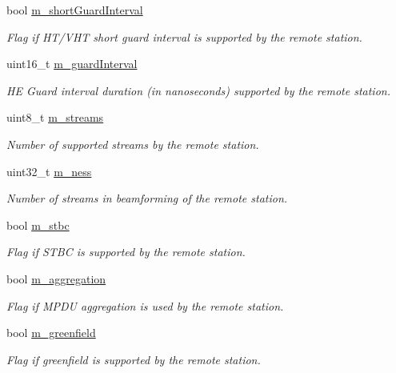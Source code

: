\begin{DoxyCompactItemize}
bool \hyperlink{structns3_1_1WifiRemoteStationState_af0c8e10d63d0b1b5737ae917b3e40b64}{m\+\_\+short\+Guard\+Interval}
\begin{DoxyCompactList}\small\item\em Flag if H\+T/\+V\+HT short guard interval is supported by the remote station. \end{DoxyCompactList}\item 
uint16\+\_\+t \hyperlink{structns3_1_1WifiRemoteStationState_a9e41a4074f9a7d5a61be765d53abcd6f}{m\+\_\+guard\+Interval}
\begin{DoxyCompactList}\small\item\em HE Guard interval duration (in nanoseconds) supported by the remote station. \end{DoxyCompactList}\item 
uint8\+\_\+t \hyperlink{structns3_1_1WifiRemoteStationState_ab79b977be200ef95202fb2428b2abd7b}{m\+\_\+streams}
\begin{DoxyCompactList}\small\item\em Number of supported streams by the remote station. \end{DoxyCompactList}\item 
uint32\+\_\+t \hyperlink{structns3_1_1WifiRemoteStationState_a6e8f943986e886b04278448baaa469c6}{m\+\_\+ness}
\begin{DoxyCompactList}\small\item\em Number of streams in beamforming of the remote station. \end{DoxyCompactList}\item 
bool \hyperlink{structns3_1_1WifiRemoteStationState_ab3569204fee0b74e9ea330c7ec2bf6e8}{m\+\_\+stbc}
\begin{DoxyCompactList}\small\item\em Flag if S\+T\+BC is supported by the remote station. \end{DoxyCompactList}\item 
bool \hyperlink{structns3_1_1WifiRemoteStationState_a83a20126c91366c8b8ba144122813ae0}{m\+\_\+aggregation}
\begin{DoxyCompactList}\small\item\em Flag if M\+P\+DU aggregation is used by the remote station. \end{DoxyCompactList}\item 
bool \hyperlink{structns3_1_1WifiRemoteStationState_af160002f58992a1e4a175d61115e108b}{m\+\_\+greenfield}
\begin{DoxyCompactList}\small\item\em Flag if greenfield is supported by the remote station. \end{DoxyCompactList}\item 

\end{DoxyCompactItemize}
